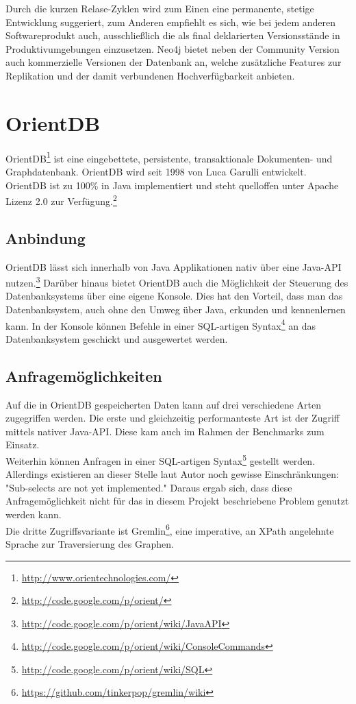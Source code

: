 \documentclass[11pt, a4paper, oneside]{article} %
\begin{document}
Durch die kurzen Relase-Zyklen wird zum Einen eine permanente, stetige Entwicklung suggeriert, zum Anderen empfiehlt es sich, wie bei jedem anderen Softwareprodukt auch, ausschließlich die als final deklarierten Versionsstände in Produktivumgebungen einzusetzen. Neo4j bietet neben der Community Version auch kommerzielle Versionen der Datenbank an, welche zusätzliche Features zur Replikation und der damit verbundenen Hochverfügbarkeit anbieten.

\section{OrientDB}

OrientDB\footnote{\url{http://www.orientechnologies.com/}} ist eine eingebettete, persistente, transaktionale Dokumenten- und Graphdatenbank. OrientDB wird seit 1998 von Luca Garulli entwickelt. OrientDB ist zu 100\% in Java implementiert und steht quelloffen unter Apache Lizenz 2.0 zur Verfügung.\footnote{\url{http://code.google.com/p/orient/}}

\subsection{Anbindung}

OrientDB lässt sich innerhalb von Java Applikationen nativ über eine Java-API nutzen.\footnote{\url{http://code.google.com/p/orient/wiki/JavaAPI}} Darüber hinaus bietet OrientDB auch die Möglichkeit der Steuerung des Datenbanksystems über eine eigene Konsole. Dies hat den Vorteil, dass man das Datenbanksystem, auch ohne den Umweg über Java, erkunden und kennenlernen kann. In der Konsole können Befehle in einer SQL-artigen Syntax\footnote{\url{http://code.google.com/p/orient/wiki/ConsoleCommands}} an das Datenbanksystem geschickt und ausgewertet werden.

\subsection{Anfragemöglichkeiten}

Auf die in OrientDB gespeicherten Daten kann auf drei verschiedene Arten zugegriffen werden. Die erste und gleichzeitig performanteste Art ist der Zugriff mittels nativer Java-API. Diese kam auch im Rahmen der Benchmarks zum Einsatz.\\
Weiterhin können Anfragen in einer SQL-artigen Syntax\footnote{\url{http://code.google.com/p/orient/wiki/SQL}} gestellt werden. Allerdings existieren an dieser Stelle laut Autor noch gewisse Einschränkungen: "Sub-selects are not yet implemented." Daraus ergab sich, dass diese Anfragemöglichkeit nicht für das in diesem Projekt beschriebene Problem genutzt werden kann.\\
Die dritte Zugriffsvariante ist Gremlin\footnote{\url{https://github.com/tinkerpop/gremlin/wiki}}, eine imperative, an XPath angelehnte Sprache zur Traversierung des Graphen.
\end{document}
